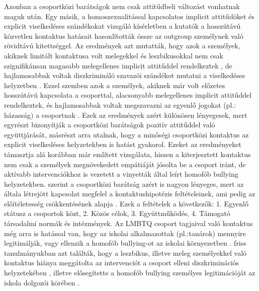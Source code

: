 Azonban a csoportközi barátságok nem csak attitűdbeli változást vonhatnak maguk után. Egy másik, a homoszexualitással kapcsolatos implicit attitűdöket és explicit viselkedéses szándékokat vizsgáló kísérletben a kutatók a hosszútávú közvetlen kontaktus hatásait hasonlították össze az outgroup személynek való rövidtávú kitettséggel. Az eredmények azt mutatták, hogy azok a személyek, akiknek limitált kontaktusa volt melegekkel és leszbikusokkal nem csak szignifikánsan magasabb melegellenes implicit attitűddel rendelkeztek \parencite{dasgupta_rivera_2008}, de hajlamosabbak voltak diszkrimináló szavazói szándékot mutatni a viselkedéses helyzetben \parencite{dasgupta_rivera_2008} . Ezzel szemben azok a személyek, akiknek már volt előzetes hosszútávú kapcsolata a csoporttal, alacsonyabb melegellenes implicit attitűddel rendelkeztek, és hajlamosabbak voltak megszavazni az egyenlő jogokat (pl.: házasság) a csoportnak \parencite{dasgupta_rivera_2008} . Ezek az eredmények azért különösen lényegesek, mert egyrészt bizonyítják a csoportközi barátságok pozitív attitűddel való együttjárását, másrészt arra utalnak, hogy a minőségi csoportközi kontaktus az explicit viselkedéses helyzetekben is hatást gyakorol. Ezeket az eredményeket támasztja alá \textcite{antonio_guerra_moleiro_2017} korábban már említett vizsgálata, hiszen a kiterjesztett kontaktus nem csak a személyek megnövekedett empátiáját jósolta be a csoport iránt, de aktívabb intervenciókhoz is vezetett a vinyetták által leírt homofób bullying helyzetekben. \textcite{pettigrew_1997} szerint a csoportközi barátság azért is nagyon lényeges, mert az általa létrejött kapcsolat megfelel a kontaktushipotézis \parencite{christie_allport_1954} feltételeinek, ami pedig az előítéletesség csökkentésének alapja \parencite{christie_allport_1954}.  Ezek a feltételek a következők:
1. Egyenlő státusz a csoportok közt, 2. Közös célok, 3. Együttműködés, 4. Támogató társadalmi normák és intézmények.
Az LMBTQ csoport tagjaival való kontaktus még arra is hatással van, hogy az iskolai alkalmazottak (pl.:tanárok) mennyire legitimálják, vagy ellenzik a homofób bullying-ot az iskolai környezetben \parencite{zotti_carnaghi_piccoli_bianchi_2018}. \textcite{zotti_carnaghi_piccoli_bianchi_2018} friss tanulmányukban azt találták, hogy a leszbikus, illetve meleg személyekkel való kontaktus hiánya meggátolta az intervenciót a csoport elleni diszkriminációs helyzetekében \parencite{zotti_carnaghi_piccoli_bianchi_2018} , illetve elősegítette a  homofób bullying személyes legitimációját az iskola dolgozói körében \parencite{zotti_carnaghi_piccoli_bianchi_2018}. \\
